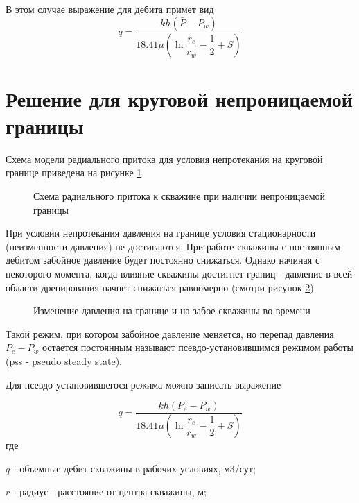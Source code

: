 В этом случае выражение для дебита примет вид
$$q=\frac{kh\left( \bar{P}-P_w\right)}{ 18.41 \mu\left(\ln{\dfrac{r_e}{r_w}}  - \dfrac{1}{2}+ S \right)}$$


\section{Решение для круговой непроницаемой границы}

Схема модели радиального притока для условия непротекания на круговой границе приведена на рисунке \ref{ris:radial_inflow_steady_state_2}.

\begin{figure}[h!]
	\begin{center}
		
		\caption{Схема радиального притока к скважине при наличии непроницаемой границы}
		\label{ris:radial_inflow_steady_state_2}
	\end{center}
\end{figure}

При условии непротекания давления на границе условия стационарности (неизменности давления) не достигаются. При работе скважины с постоянным дебитом забойное давление будет постоянно снижаться. Однако начиная с некоторого момента, когда влияние скважины достигнет границ - давление в всей области дренирования начнет снижаться равномерно (смотри рисунок \ref{ris:radial_pss_dynamics}). 

\begin{figure}[h!]
	\begin{center}
		
		\caption{Изменение давления на границе и на забое скважины во времени}
		\label{ris:radial_pss_dynamics}
	\end{center}
\end{figure}

Такой режим, при котором забойное давление меняется, но перепад давления $P_e - P_w$ остается постоянным называют псевдо-установившимся режимом работы (pss - pseudo steady state). 

Для псевдо-установившегося режима можно записать выражение

$$q=\frac{kh\left(P_e-P_w\right)}{ 18.41 \mu\left(\ln{\dfrac{r_e}{r_w}} - \dfrac{1}{2} + S\right)}$$
где 

$q$ - объемные дебит скважины в рабочих условиях, м3/сут;

$r$ -  радиус - расстояние от центра скважины, м;

